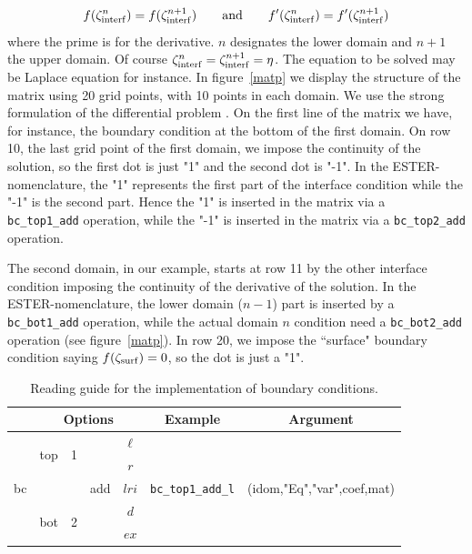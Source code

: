 \[ f(\zeta_{\rm interf}^n) = f(\zeta_{\rm interf}^{n+1}) \qquad {\rm and}\qquad f'(\zeta_{\rm
interf}^n) = f'(\zeta_{\rm interf}^{n+1})\]
where the prime is for the derivative. $n$ designates the lower domain
and $n+1$ the upper domain. Of course $\zeta_{\rm interf}^n=\zeta_{\rm
interf}^{n+1}=\eta$. The equation to be solved may be Laplace
equation for instance. In figure~\ref{matp} we display the structure of the
matrix using 20 grid points, with 10 points in each domain. We use the
strong formulation of the differential problem \cite[][]{RELP16}. On the
first line of the matrix we have, for instance, the boundary condition
at the bottom of the first domain. On row 10, the last grid point of the
first domain, we impose the continuity of the solution, so the first dot
is just "1" and the second dot is "-1". In the ESTER-nomenclature, the
"1" represents the first part of the interface condition while the "-1"
is the second part. Hence the "1" is inserted in the matrix via a {\tt
bc\_top1\_add} operation, while the "-1" is inserted in the matrix via a
{\tt bc\_top2\_add}  operation.

The second domain, in our example, starts at row 11 by the other
interface condition imposing the continuity of the derivative of the
solution. In the ESTER-nomenclature, the lower domain ($n-1$) part is
inserted by a {\tt bc\_bot1\_add} operation, while the actual domain $n$
condition need a {\tt bc\_bot2\_add} operation (see figure~\ref{matp}). In
row 20, we impose the ``surface" boundary condition saying $f(\zeta_{\rm
surf})=0$, so the dot is just a "1".

\begin{table}
\begin{tabular}{|c|c|c|c|c|c|c|}
\hline
 &\multicolumn{4}{c|}{Options} & Example & Argument \\
\hline
\multirow{5}{1cm}{bc} & \multirow{2}{1cm}{top} & \multirow{2}{1cm}{1} &
\multirow{5}{1cm}{add} & $\ell$ & \multirow{5}{2.5cm}{\tt bc\_top1\_add\_l}
 & \multirow{5}{4.5cm}{(idom,"Eq","var",coef,mat)} \\
      &     &   &         &  $r$   &  & \\
      &     &   &         &  $lri$   &  & \\
      & \multirow{2}{1cm}{bot} & \multirow{2}{1cm}{2}   &         &  $d$   &  & \\
      &     &   &         &  $ex$   &  & \\
\hline
\end{tabular}
\caption[]{Reading guide for the implementation of boundary conditions.}
\end{table}

